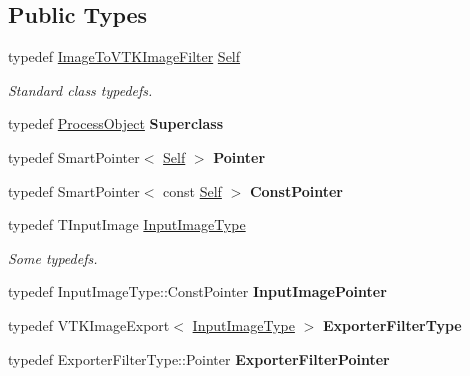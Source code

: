 \subsection*{Public Types}
\begin{DoxyCompactItemize}
\item 
typedef \hyperlink{classitk_1_1_image_to_v_t_k_image_filter}{ImageToVTKImageFilter} \hyperlink{classitk_1_1_image_to_v_t_k_image_filter_aa50164b556fb84d67e8631f5649d13e9}{Self}
\begin{DoxyCompactList}\small\item\em Standard class typedefs. \item\end{DoxyCompactList}\item 
\hypertarget{classitk_1_1_image_to_v_t_k_image_filter_a6fd526e20e86c11e356390cbf37191a8}{
typedef \hyperlink{class_process_object}{ProcessObject} {\bfseries Superclass}}
\label{classitk_1_1_image_to_v_t_k_image_filter_a6fd526e20e86c11e356390cbf37191a8}

\item 
\hypertarget{classitk_1_1_image_to_v_t_k_image_filter_a3400da105749199d5143f0e63bb0c768}{
typedef SmartPointer$<$ \hyperlink{classitk_1_1_image_to_v_t_k_image_filter}{Self} $>$ {\bfseries Pointer}}
\label{classitk_1_1_image_to_v_t_k_image_filter_a3400da105749199d5143f0e63bb0c768}

\item 
\hypertarget{classitk_1_1_image_to_v_t_k_image_filter_a058254c76c526a16dca79770886f0357}{
typedef SmartPointer$<$ const \hyperlink{classitk_1_1_image_to_v_t_k_image_filter}{Self} $>$ {\bfseries ConstPointer}}
\label{classitk_1_1_image_to_v_t_k_image_filter_a058254c76c526a16dca79770886f0357}

\item 
typedef TInputImage \hyperlink{classitk_1_1_image_to_v_t_k_image_filter_a4676ef1161730b61cddaf6ac892662f3}{InputImageType}
\begin{DoxyCompactList}\small\item\em Some typedefs. \item\end{DoxyCompactList}\item 
\hypertarget{classitk_1_1_image_to_v_t_k_image_filter_a3138f40f2bc46018bc6647e9f041fafe}{
typedef InputImageType::ConstPointer {\bfseries InputImagePointer}}
\label{classitk_1_1_image_to_v_t_k_image_filter_a3138f40f2bc46018bc6647e9f041fafe}

\item 
\hypertarget{classitk_1_1_image_to_v_t_k_image_filter_a03c5b387b58f71dbbbc5dfcbeaf0d05b}{
typedef VTKImageExport$<$ \hyperlink{classitk_1_1_image_to_v_t_k_image_filter_a4676ef1161730b61cddaf6ac892662f3}{InputImageType} $>$ {\bfseries ExporterFilterType}}
\label{classitk_1_1_image_to_v_t_k_image_filter_a03c5b387b58f71dbbbc5dfcbeaf0d05b}

\item 
\hypertarget{classitk_1_1_image_to_v_t_k_image_filter_a52a58193bdb8d61c70f0708770c1cbc6}{
typedef ExporterFilterType::Pointer {\bfseries ExporterFilterPointer}}
\label{classitk_1_1_image_to_v_t_k_image_filter_a52a58193bdb8d61c70f0708770c1cbc6}

\end{DoxyCompactItemize}
